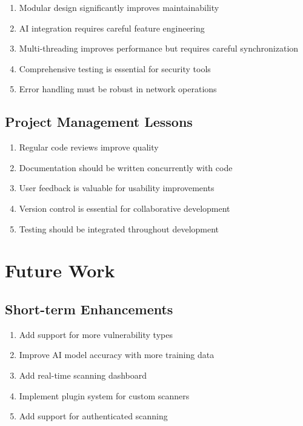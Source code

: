 \documentclass[12pt,a4paper]{report}
\begin{document}
\begin{enumerate}
    \item Modular design significantly improves maintainability
    \item AI integration requires careful feature engineering
    \item Multi-threading improves performance but requires careful synchronization
    \item Comprehensive testing is essential for security tools
    \item Error handling must be robust in network operations
\end{enumerate}

\subsection{Project Management Lessons}

\begin{enumerate}
    \item Regular code reviews improve quality
    \item Documentation should be written concurrently with code
    \item User feedback is valuable for usability improvements
    \item Version control is essential for collaborative development
    \item Testing should be integrated throughout development
\end{enumerate}

\section{Future Work}

\subsection{Short-term Enhancements}

\begin{enumerate}
    \item Add support for more vulnerability types
    \item Improve AI model accuracy with more training data
    \item Add real-time scanning dashboard
    \item Implement plugin system for custom scanners
    \item Add support for authenticated scanning
\end{enumerate}
\end{document}
